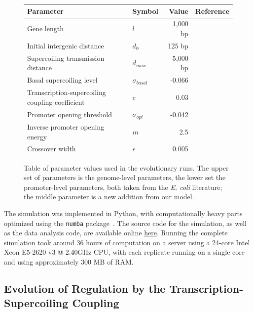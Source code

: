 \begin{figure}[H]
  \begin{center}
    \begin{tabular}{ l  l  r  c }
    \toprule
    \textbf{Parameter} & \textbf{Symbol} & \textbf{Value} & \textbf{Reference} \\
    \midrule
    Gene length & $l$ & 1,000 bp & \cite{blattner1997} \\
    Initial intergenic distance & $d_0$ & 125 bp & \cite{blattner1997} \\
    Supercoiling transmission distance & $d_{max}$ & 5,000 bp & \cite{klein2021} \\
    Basal supercoiling level & $\sigma_{basal}$ & -0.066 & \cite{crozat2005} \\
    \midrule
    Transcription-supercoiling coupling coefficient & $c$ & 0.03 & \\
    \midrule
    Promoter opening threshold & $\sigma_{opt}$ & -0.042 & \cite{elhoudaigui2019} \\
    Inverse promoter opening energy & $m$ & 2.5 & \cite{elhoudaigui2019} \\
    Crossover width & $\epsilon$ & 0.005 & \cite{elhoudaigui2019} \\
    \bottomrule
    \end{tabular}
    \end{center}
  \caption{Table of parameter values used in the evolutionary runs.
  The upper set of parameters is the genome-level parameters, the lower set the promoter-level parameters, both taken from the \emph{E. coli} literature; the middle parameter is a new addition from our model.}
  \label{fig:param_values}
\end{figure}

The simulation was implemented in Python, with computationally heavy parts optimized using the \texttt{numba} package~\citep{lam2015}. The source code for the simulation, as well as the data analysis code, are available online \href{https://gitlab.inria.fr/tgrohens/evotsc}{here}.
Running the complete simulation took around 36 hours of computation on a server using a 24-core Intel Xeon E5-2620 v3 @ 2.40GHz CPU, with each replicate running on a single core and using approximately 300 MB of RAM.

\subsection{Evolution of Regulation by the Transcription-Supercoiling Coupling}

